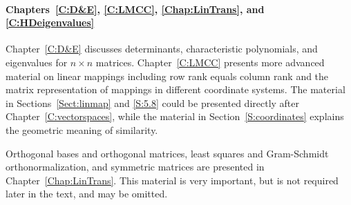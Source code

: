 \documentclass{ximera}
\begin{document}


\paragraph{Chapters~\ref{C:D&E}, \ref{C:LMCC}, \ref{Chap:LinTrans}, and 
  \ref{C:HDeigenvalues}}
Chapter~\ref{C:D&E} 
discusses determinants, characteristic polynomials, and eigenvalues for
$n\times n$ matrices.  Chapter~\ref{C:LMCC} presents more advanced
material on linear mappings including row rank equals column rank and the
matrix representation of mappings in different coordinate systems.  The 
material in Sections~\ref{Sect:linmap} and \ref{S:5.8} could be presented 
directly after Chapter~\ref{C:vectorspaces}, while the material in
Section~\ref{S:coordinates} explains the geometric meaning of similarity.

Orthogonal bases and orthogonal matrices, least squares and Gram-Schmidt
orthonormalization, and symmetric matrices are presented in 
Chapter~\ref{Chap:LinTrans}.  This material is very important, but is not 
required later in the text, and may be omitted.
\end{document}
